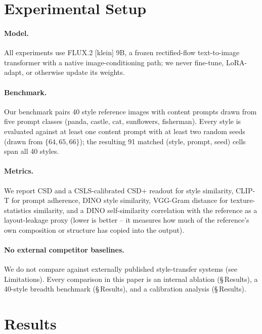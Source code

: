\documentclass[letterpaper]{article} %
\begin{document}
\section{Experimental Setup}

\paragraph{Model.} All experiments use FLUX.2 [klein] 9B, a frozen
rectified-flow text-to-image transformer with a native image-conditioning
path; we never fine-tune, LoRA-adapt, or otherwise update its weights.

\paragraph{Benchmark.} Our benchmark pairs 40 style reference images with
content prompts drawn from five prompt classes (panda, castle, cat,
sunflowers, fisherman). Every style is evaluated against at least one content
prompt with at least two random seeds (drawn from $\{64,65,66\}$); the
resulting 91 matched (style, prompt, seed) cells span all 40 styles.

\paragraph{Metrics.} We report CSD \cite{somepalli2024csd} and a
CSLS-calibrated CSD+ readout \cite{frochte2026csd} for style similarity,
CLIP-T \cite{radford2021clip} for prompt adherence, DINO \cite{oquab2024dinov2}
style similarity, VGG-Gram distance for texture-statistics similarity, and a
DINO self-similarity correlation with the reference as a layout-leakage proxy
(lower is better -- it measures how much of the reference's own composition or
structure has copied into the output).

\paragraph{No external competitor baselines.} We do not compare against
externally published style-transfer systems (see Limitations). Every
comparison in this paper is an internal ablation (\S\,Results), a 40-style
breadth benchmark (\S\,Results), and a calibration analysis (\S\,Results).

\section{Results}
\end{document}
